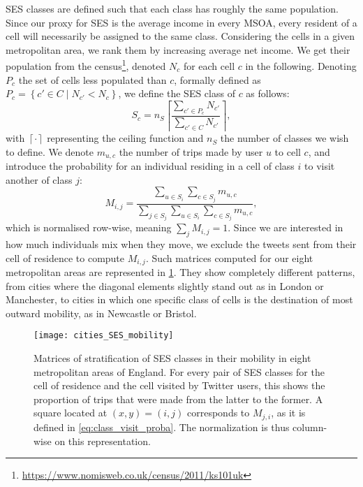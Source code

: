 \documentclass[../thesis.tex]{subfiles}
\begin{document}
\Ac{SES} classes are defined such that each class has roughly the same population. Since
our proxy for \ac{SES} is the average income in every \ac{MSOA}, every resident of a
cell will necessarily be assigned to the same class. Considering the cells in a given
metropolitan area, we rank them by increasing average net income. We get their
population from the
census\footnote{\url{https://www.nomisweb.co.uk/census/2011/ks101uk}}, denoted $N_c$ for
each cell $c$ in the following. Denoting $P_c$ the set of cells less populated than $c$,
formally defined as $P_c = \left\{ c' \in C \mid N_{c'} < N_c \right\}$, we define the
\ac{SES} class of $c$ as follows:
\begin{equation}
  S_c = n_S \left\lceil \frac{\sum_{c' \in P_c} N_{c'}}{\sum_{c' \in C} N_{c'}} \right\rceil,
\end{equation}
with $\left\lceil \cdot \right\rceil$ representing the ceiling function and $n_S$ the
number of classes we wish to define. We denote $m_{u, c}$ the number of trips made by
user $u$ to cell $c$, and introduce the probability for an individual residing in a cell
of class $i$ to visit another of class $j$:
\begin{equation}
  \label{eq:class_visit_proba}
  M_{i, j} = \frac{
      \sum_{u \in S_i} \sum_{c \in S_j} m_{u, c}
    }{
      \sum_{j \in S_j} \sum_{u \in S_i} \sum_{c \in S_j} m_{u, c}
    },
\end{equation}
which is normalised row-wise, meaning $\sum_j M_{i, j} = 1$. Since we are interested in
how much individuals mix when they move, we exclude the tweets sent from their cell of
residence to compute $M_{i, j}$. Such matrices computed for our eight metropolitan areas
are represented in \cref{fig:cities_SES_mobility}. They show completely different
patterns, from cities where the diagonal elements slightly stand out as in London or
Manchester, to cities in which one specific class of cells is the destination of most
outward mobility, as in Newcastle or Bristol.
\begin{figure}
\centering
  \texttt{[image: cities\_SES\_mobility]}
  \caption{ Matrices of stratification of \ac{SES} classes in their mobility in eight
  metropolitan areas of England. For every pair of \ac{SES} classes for the cell of
  residence and the cell visited by Twitter users, this shows the proportion of trips
  that were made from the latter to the former. A square located at $(x, y) = (i, j)$
  corresponds to $M_{j, i}$, as it is defined in \cref{eq:class_visit_proba}. The
  normalization is thus column-wise on this representation.}
  \label{fig:cities_SES_mobility}
\end{figure}
\end{document}
